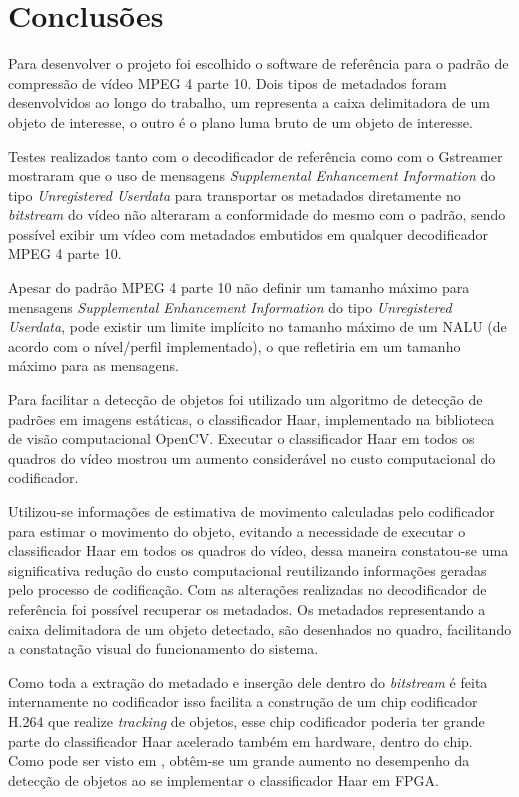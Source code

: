 \chapter{ Conclusões }

Para desenvolver o projeto foi escolhido o software de referência para o padrão de compressão de vídeo MPEG 4 parte 10. Dois tipos de metadados foram desenvolvidos ao longo do trabalho, um representa a caixa delimitadora de um objeto de interesse, o outro é o plano luma bruto de um objeto de interesse. 

Testes realizados tanto com o decodificador de referência como com o Gstreamer mostraram que o uso de mensagens \textit{Supplemental Enhancement Information} do tipo \textit{Unregistered Userdata} para transportar os metadados diretamente no \textit{bitstream} do vídeo não alteraram a conformidade do mesmo com o padrão, sendo possível exibir um vídeo com metadados embutidos em qualquer decodificador MPEG 4 parte 10. 

Apesar do padrão MPEG 4 parte 10 não definir um tamanho máximo para mensagens \textit{Supplemental Enhancement Information} do tipo \textit{Unregistered Userdata}, pode existir um limite implícito no tamanho máximo de um NALU (de acordo com o nível/perfil implementado), o que refletiria em um tamanho máximo para as mensagens. 

Para facilitar a detecção de objetos foi utilizado um algoritmo de detecção de padrões em imagens estáticas, o classificador Haar, implementado na biblioteca de visão computacional OpenCV. Executar o classificador Haar em todos os quadros do vídeo mostrou um aumento considerável no custo computacional do codificador. 

Utilizou-se informações de estimativa de movimento calculadas pelo codificador para estimar o movimento do objeto, evitando a necessidade de executar o classificador Haar em todos os quadros do vídeo, dessa maneira constatou-se uma significativa redução do custo computacional reutilizando informações geradas pelo processo de codificação. Com as alterações realizadas no decodificador de referência foi possível recuperar os metadados. Os metadados representando a caixa delimitadora de um objeto detectado, são desenhados no quadro, facilitando a constatação visual do funcionamento do sistema.  

Como toda a extração do metadado e inserção dele dentro do \textit{bitstream} é feita internamente no codificador isso facilita a construção de um chip codificador H.264 que realize \textit{tracking} de objetos, esse chip codificador poderia ter grande parte do classificador Haar acelerado também em hardware, dentro do chip. Como pode ser visto em \cite{haarFPGA}, obtêm-se um grande aumento no desempenho da detecção de objetos ao se implementar o classificador Haar em FPGA. 

